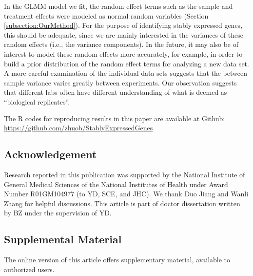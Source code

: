 \documentclass[letterpaper,12pt]{article}
\begin{document}
			
			In the GLMM model we fit, the random effect terms such as the sample and treatment
			effects were modeled as normal random variables (Section
			\ref{subsection:OurMethod}). For the purpose of identifying stably
			expressed genes, this should be adequate, since we are mainly interested in
			the variances of these random effects (i.e., the variance components). In the
			future, it may also be of interest to model these random effects more
			accurately, for example, in order to build a prior distribution of the random
			effect terms for analyzing a new data set. A more careful examination of the
			individual data sets suggests that the between-sample variance varies greatly
			between experiments. Our observation suggests that different labs often have
			different understanding of what is deemed as ``biological replicates''.
			
			The R codes for reproducing results in this paper are available at Github:
			\url{https://github.com/zhuob/StablyExpressedGenes}
			
			\subsection*{Acknowledgement}	
			Research reported in this publication was supported by the National Institute of 
			General Medical Sciences of the National Institutes of Health under Award Number 
			R01GM104977 (to YD, SCE, and JHC). We thank Duo Jiang and Wanli Zhang for helpful 
			discussions. This article is part of doctor dissertation written by BZ under the 
			supervision of YD. 
			
			\subsection*{Supplemental Material}The online version of this article offers 
			supplementary material,
			available to authorized users.
			
			
		\newpage

		

\end{document}
